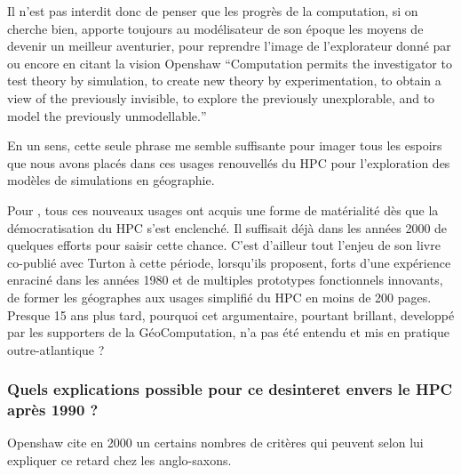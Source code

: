 Il n'est pas interdit donc de penser que les progrès de la computation, si on cherche bien, apporte toujours au modélisateur de son époque les moyens de devenir un meilleur aventurier, pour reprendre l'image de l'explorateur donné par \textcite[22]{Banos2013} ou encore en citant la vision Openshaw \foreignquote{english}{Computation permits the investigator to test theory by simulation, to create new theory by experimentation, to obtain a view of the previously invisible, to explore the previously unexplorable, and to model the previously unmodellable.}

En un sens, cette seule phrase me semble suffisante pour imager tous les espoirs que nous avons placés dans ces usages renouvellés du HPC pour l'exploration des modèles de simulations en géographie.

Pour \textcite{Openshaw2000}, tous ces nouveaux usages ont acquis une forme de matérialité dès que la démocratisation du HPC s'est enclenché. Il suffisait déjà dans les années 2000 de quelques efforts pour saisir cette chance. C'est d'ailleur tout l'enjeu de son livre co-publié avec Turton à cette période, lorsqu'ils proposent, forts d'une expérience enraciné dans les années 1980 et de multiples prototypes fonctionnels innovants, de former les géographes aux usages simplifié du HPC en moins de 200 pages. Presque 15 ans plus tard,  pourquoi cet argumentaire, pourtant brillant, developpé par les supporters de la GéoComputation, n'a pas été entendu et mis en pratique outre-atlantique ?



\subsubsection{Quels explications possible pour ce desinteret envers le HPC après 1990 ? }
\label{sssec:desertionHPC}

Openshaw cite en 2000 un certains nombres de critères qui peuvent selon lui expliquer ce retard chez les anglo-saxons.

